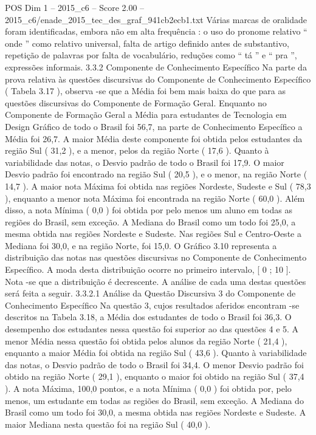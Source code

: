 \begin{textsample}{POS Dim 1 – 2015\_c6 – Score 2.00 – 2015\_c6/enade\_2015\_tec\_des\_graf\_941cb2ecb1.txt}
Várias marcas de oralidade foram identificadas, embora não em alta frequência : o uso do pronome relativo “ onde ” como relativo universal, falta de artigo definido antes de substantivo, repetição de palavras por falta de vocabulário, reduções como “ tá ” e “ pra ”, expressões informais. 3.3.2 Componente de Conhecimento Específico Na parte da prova relativa às questões discursivas do Componente de Conhecimento Específico ( Tabela 3.17 ), observa -se que a Média foi bem mais baixa do que para as questões discursivas do Componente de Formação Geral.
Enquanto no Componente de Formação Geral a Média para estudantes de Tecnologia em Design Gráfico de todo o Brasil foi 56,7, na parte de Conhecimento Específico a Média foi 26,7.
A maior Média deste componente foi obtida pelos estudantes da região Sul ( 31,2 ), e a menor, pelos da região Norte ( 17,6 ).
Quanto à variabilidade das notas, o Desvio padrão de todo o Brasil foi 17,9.
O maior Desvio padrão foi encontrado na região Sul ( 20,5 ), e o menor, na região Norte ( 14,7 ).
A maior nota Máxima foi obtida nas regiões Nordeste, Sudeste e Sul ( 78,3 ), enquanto a menor nota Máxima foi encontrada na região Norte ( 60,0 ).
Além disso, a nota Mínima ( 0,0 ) foi obtida por pelo menos um aluno em todas as regiões do Brasil, sem exceção.
A Mediana do Brasil como um todo foi 25,0, a mesma obtida nas regiões Nordeste e Sudeste.
Nas regiões Sul e Centro-Oeste a Mediana foi 30,0, e na região Norte, foi 15,0.
O Gráfico 3.10 representa a distribuição das notas nas questões discursivas no Componente de Conhecimento Específico.
A moda desta distribuição ocorre no primeiro intervalo, [ 0 ; 10 ].
Nota -se que a distribuição é decrescente.
A análise de cada uma destas questões será feita a seguir. 3.3.2.1 Análise da Questão Discursiva 3 do Componente de Conhecimento Específico Na questão 3, cujos resultados aferidos encontram -se descritos na Tabela 3.18, a Média dos estudantes de todo o Brasil foi 36,3.
O desempenho dos estudantes nessa questão foi superior ao das questões 4 e 5.
A menor Média nessa questão foi obtida pelos alunos da região Norte ( 21,4 ), enquanto a maior Média foi obtida na região Sul ( 43,6 ).
Quanto à variabilidade das notas, o Desvio padrão de todo o Brasil foi 34,4.
O menor Desvio padrão foi obtido na região Norte ( 29,1 ), enquanto o maior foi obtido na região Sul ( 37,4 ).
A nota Máxima, 100,0 pontos, e a nota Mínima ( 0,0 ) foi obtida por, pelo menos, um estudante em todas as regiões do Brasil, sem exceção.
A Mediana do Brasil como um todo foi 30,0, a mesma obtida nas regiões Nordeste e Sudeste.
A maior Mediana nesta questão foi na região Sul ( 40,0 ).

\end{textsample}
